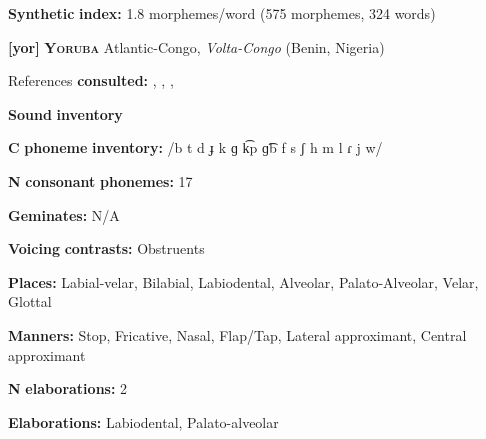 \begin{styleBody}
\textbf{Synthetic} \textbf{index:} 1.8 morphemes/word (575 morphemes, 324 words)
\end{styleBody}

\begin{styleBody}
\textbf{[yor]}   \textbf{\textsc{Yoruba}}  Atlantic-Congo, \textit{Volta-Congo} (Benin, Nigeria)
\end{styleBody}

\begin{styleBody}
References \textbf{consulted:} \citet{Bamgbose1966}, \citet{Rowlands1969}, \citet{Seidl2000}, \citet{Siertsema1959}
\end{styleBody}

\begin{styleBody}
\textbf{Sound} \textbf{inventory}
\end{styleBody}

\begin{styleBody}
\textbf{C} \textbf{phoneme} \textbf{inventory:} /b t d ɟ k ɡ k͡p ɡ͡b f s ʃ h m l ɾ j w/
\end{styleBody}

\begin{styleBody}
\textbf{N} \textbf{consonant} \textbf{phonemes:} 17
\end{styleBody}

\begin{styleBody}
\textbf{Geminates:} N/A
\end{styleBody}

\begin{styleBody}
\textbf{Voicing} \textbf{contrasts:} Obstruents
\end{styleBody}

\begin{styleBody}
\textbf{Places:} Labial-velar, Bilabial, Labiodental, Alveolar, Palato-Alveolar, Velar, Glottal
\end{styleBody}

\begin{styleBody}
\textbf{Manners:} Stop, Fricative, Nasal, Flap/Tap, Lateral approximant, Central approximant
\end{styleBody}

\begin{styleBody}
\textbf{N} \textbf{elaborations:} 2
\end{styleBody}

\begin{styleBody}
\textbf{Elaborations:} Labiodental, Palato-alveolar
\end{styleBody}

